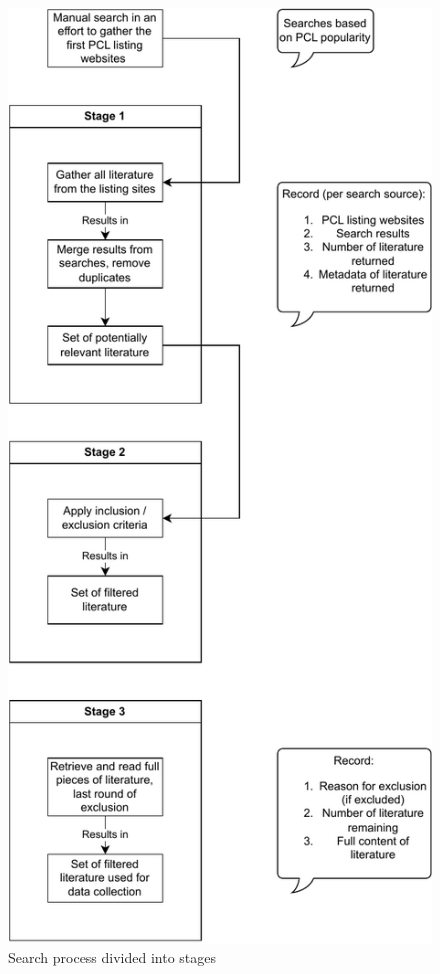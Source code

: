 \begin{figure}
	\centering
	\includegraphics[scale=0.85]{figures/search-process.pdf}
	\caption{Search process divided into stages}
	\label{fig:search-process}
\end{figure}

